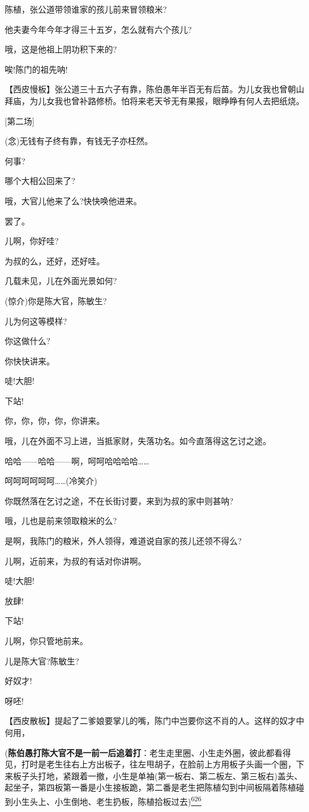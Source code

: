 陈植，张公道带领谁家的孩儿前来冒领粮米?

他夫妻今年今年才得三十五岁，怎么就有六个孩儿?

哦，这是他祖上阴功积下来的?

唉!陈门的祖先呐!

【西皮慢板】张公道三十五六子有靠，陈伯愚年半百无有后苗。为儿女我也曾朝山拜庙，为儿女我也曾补路修桥。怕将来老天爷无有果报，眼睁睁有何人去把纸烧。

{[}第二场{]}

(念)无钱有子终有靠，有钱无子亦枉然。

何事?

哪个大相公回来了?

哦，大官儿他来了么?快快唤他进来。

罢了。

儿啊，你好哇?

为叔的么，还好，还好哇。

几载未见，儿在外面光景如何?

(惊介)你是陈大官，陈敏生?

儿为何这等模样?

你这做什么?

你快快讲来。

唗!大胆!

下站!

你，你，你，你，你讲来。

哦，儿在外面不习上进，当抵家财，失落功名。如今直落得这乞讨之途。

哈哈------哈哈------啊，呵呵哈哈哈哈\ldots{}\ldots{}

呵呵呵呵呵呵\ldots{}\ldots{}(冷笑介)

你既然落在乞讨之途，不在长街讨要，来到为叔的家中则甚呐?

哦，儿也是前来领取粮米的么?

是啊，我陈门的粮米，外人领得，难道说自家的孩儿还领不得么?

儿啊，近前来，为叔的有话对你讲啊。

唗!大胆!

放肆!

下站!

儿啊，你只管地前来。

儿是陈大官?陈敏生?

好奴才!

呀呸!

【西皮散板】提起了二爹娘要掌儿的嘴，陈门中岂要你这不肖的人。这样的奴才中何用，

(\textbf{陈伯愚打陈大官不是一前一后追着打}：老生走里圈、小生走外圈，彼此都看得见，打时是老生往右上方出板子，往左甩胡子，在脸前上方用板子头画一个圈，下来板子头打地，紧跟着一撤，小生是单袖(第一板右、第二板左、第三板右)盖头、起坐子，第四板第一番是小生接板跪，第二番是老生把陈植勾到中间板隔着陈植碰到小生头上、小生倒地、老生扔板，陈植拾板过去)\protect\hyperlink{fn626}{\textsuperscript{626}}

